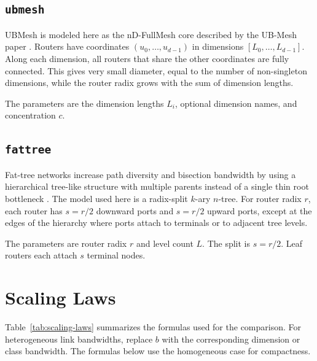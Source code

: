 \documentclass[11pt]{article}
\newcommand{\toponame}[1]{\texttt{#1}}
\begin{document}
\subsection{\toponame{ubmesh}}

UBMesh is modeled here as the nD-FullMesh core described by the UB-Mesh paper
\cite{liao2025ubmesh}. Routers have coordinates
$(u_0,\ldots,u_{d-1})$ in dimensions $[L_0,\ldots,L_{d-1}]$. Along each
dimension, all routers that share the other coordinates are fully connected.
This gives very small diameter, equal to the number of non-singleton
dimensions, while the router radix grows with the sum of dimension lengths.

The parameters are the dimension lengths $L_i$, optional dimension names, and
concentration $c$.

\subsection{\toponame{fattree}}

Fat-tree networks increase path diversity and bisection bandwidth by using a
hierarchical tree-like structure with multiple parents instead of a single
thin root bottleneck \cite{leiserson1985fattree}. The model used here is a
radix-split $k$-ary $n$-tree. For router radix $r$, each router has
$s=r/2$ downward ports and $s=r/2$ upward ports, except at the edges of the
hierarchy where ports attach to terminals or to adjacent tree levels.

The parameters are router radix $r$ and level count $L$. The split is
$s=r/2$. Leaf routers each attach $s$ terminal nodes.

\section{Scaling Laws}

Table~\ref{tab:scaling-laws} summarizes the formulas used for the comparison.
For heterogeneous link bandwidths, replace $b$ with the corresponding
dimension or class bandwidth. The formulas below use the homogeneous case for
compactness.
\end{document}
